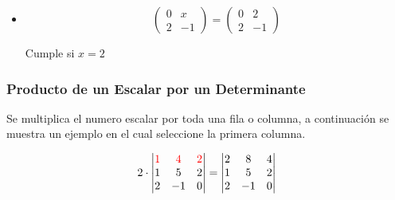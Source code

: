 \documentclass[stu, 12pt, letterpaper, donotrepeattitle, floatsintext, natbib]{apa7}
\begin{document}
\begin{itemize}
        \item \begin{equation*}
                  \begin{pmatrix}
                      0 & x  \\
                      2 & -1
                  \end{pmatrix}
                  =
                  \begin{pmatrix}
                      0 & 2  \\
                      2 & -1
                  \end{pmatrix}
        \end{equation*}
        \begin{center}
            Cumple si $x=2$
        \end{center}
    \end{itemize}

    \subsubsection{Producto de un Escalar por un Determinante}
    Se multiplica el numero escalar por toda una fila o columna, a continuación se muestra un ejemplo en el cual seleccione la primera columna.

    \[
        2 \cdot
        \begin{vmatrix}
            \color{red}1 & \color{red}4 & \color{red}2 \\
            1            & 5            & 2            \\
            2            & -1           & 0            \\
        \end{vmatrix}
        =
        \begin{vmatrix}
            2 & 8  & 4 \\
            1 & 5  & 2 \\
            2 & -1 & 0
        \end{vmatrix}
    \]
    \newpage
\end{document}
